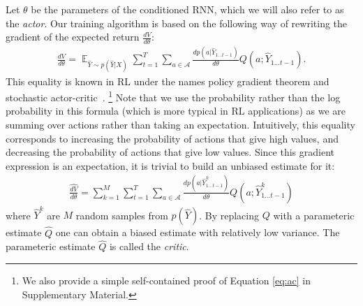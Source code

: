 \documentclass{article} \usepackage{iclr2017_conference,times}
\DeclareMathOperator*{\Exp}{\mathbb{E}}
\begin{document}
Let $\theta$ be the parameters of the conditioned RNN, which we will also refer to as the \textit{actor}.
Our training algorithm is based on the following way of rewriting the gradient 
of the expected return $\frac{dV}{d\theta}$:
 \begin{align}
    \frac{dV}{d\theta} = 
    \Exp_{\hat{Y} \sim p(\hat{Y}|X)} 
    \sum\limits_{t=1}^T
    \sum\limits_{a \in \mathcal{A}}
    \frac{dp(a|\hat{Y}_{1 \ldots t - 1})}{d\theta}
    Q(a;\hat{Y}_{1 \ldots t - 1})
    \label{eq:ac}.
\end{align}
This equality is known in RL under the names policy gradient theorem \citep{sutton1999policy}
and stochastic actor-critic~\citep{sutton1984temporal}.
\footnote{We also provide a simple self-contained proof of Equation \eqref{eq:ac} in Supplementary Material.}
Note that we use the probability rather than the log probability in this formula 
(which is more typical in RL applications) as we are summing over actions rather than taking an expectation.  
Intuitively, this equality corresponds to increasing the probability of actions 
that give high values, and decreasing the probability of actions that give low values. 
Since this gradient expression is an expectation,
it is trivial to build an unbiased estimate for it:
\begin{align}
    \widehat{\frac{dV}{d\theta}} = 
    \sum\limits_{k=1}^M
    \sum\limits_{t=1}^T
    \sum\limits_{a \in \mathcal{A}}
    \frac{dp(a|\hat{Y}^k_{1 \ldots t - 1})}{d\theta}
    Q(a;\hat{Y}^k_{1 \ldots t - 1})
    \label{eq:actor_critic}
\end{align}
where $\hat{Y}^k$ are $M$ random samples from $p(\hat{Y})$. By replacing $Q$
with a parameteric estimate $\hat{Q}$ one can obtain a biased estimate with
relatively low variance. The parameteric estimate $\hat{Q}$ is
called the \textit{critic}.
\end{document}
